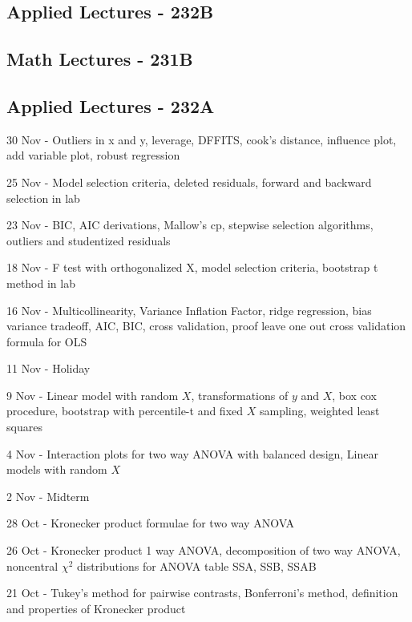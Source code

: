 \documentclass[10pt, twocolumn]{article}
\begin{document}
\subsection*{Applied Lectures - 232B}

\subsection*{Math Lectures - 231B}

\newpage

\subsection*{Applied Lectures - 232A}

30 Nov - Outliers in x and y, leverage, DFFITS, cook's distance, influence
plot, add variable plot, robust regression

25 Nov - Model selection criteria, deleted residuals, forward and backward
selection in lab

23 Nov - BIC, AIC derivations, Mallow's cp, stepwise selection algorithms,
outliers and studentized residuals

18 Nov - F test with orthogonalized X, model selection criteria,
bootstrap t method in lab

16 Nov - Multicollinearity, Variance Inflation Factor,
ridge regression, bias variance tradeoff, AIC, BIC, cross validation, proof leave
one out cross validation formula for OLS 

11 Nov - Holiday

9 Nov - Linear model with random $X$, transformations of $y$ and $X$, box
cox procedure, bootstrap with percentile-t and fixed $X$ sampling, weighted
least squares

4 Nov - Interaction plots for two way ANOVA with balanced design, Linear
models with random $X$

2 Nov - Midterm

28 Oct - Kronecker product formulae for two way ANOVA

26 Oct - Kronecker product 1 way ANOVA, decomposition of two way ANOVA,
noncentral $\chi^2$ distributions for ANOVA table SSA, SSB, SSAB

21 Oct - Tukey's method for pairwise contrasts, Bonferroni's method,
definition and properties of Kronecker product

\newpage
\end{document}
